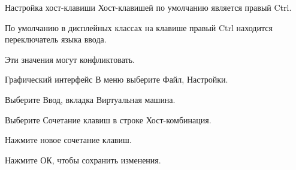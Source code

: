 \documentclass[
  ignorenonframetext,
  aspectratio=169,
  russian,
]{beamer}
\begin{document}
\begin{frame}{Настройка хост-клавиши}
\label{ux43dux430ux441ux442ux440ux43eux439ux43aux430-ux445ux43eux441ux442-ux43aux43bux430ux432ux438ux448ux438}
Хост-клавишей по умолчанию является правый Ctrl.

По умолчанию в дисплейных классах на клавише правый Ctrl находится
переключатель языка ввода.

Эти значения могут конфликтовать.
\end{frame}

\begin{frame}{Графический интерфейс}
\label{ux433ux440ux430ux444ux438ux447ux435ux441ux43aux438ux439-ux438ux43dux442ux435ux440ux444ux435ux439ux441}
В меню выберите Файл, Настройки.

Выберите Ввод, вкладка Виртуальная машина.

Выберите Сочетание клавиш в строке Хост-комбинация.

Нажмите новое сочетание клавиш.

Нажмите ОК, чтобы сохранить изменения.
\end{frame}
\end{document}
